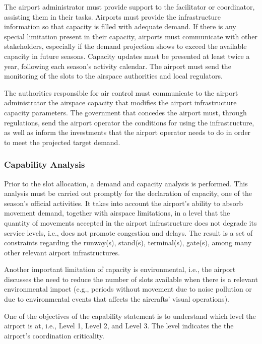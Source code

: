 The airport administrator must provide support to the facilitator or
coordinator, assisting them in their tasks.
%
Airports must provide the infrastructure information so that capacity is filled
with adequate demand.
%
If there is any special limitation present in their capacity, airports must
communicate with other stakeholders, especially if the demand projection
shows to exceed the available capacity in future seasons.
%
Capacity updates must be presented at least twice a year, following each
season's activity calendar.
%
The airport must send the monitoring of the slots to the airspace authorities
and local regulators.



The authorities responsible for air control must communicate to the airport
administrator the airspace capacity that modifies the airport infrastructure
capacity parameters.
%
The government that concedes the airport must, through regulations, send the
airport operator the conditions for using the infrastructure, as well as inform
the investments that the airport operator needs to do in order to meet the
projected target demand.




\subsubsection{Capability Analysis}

Prior to the slot allocation, a demand and capacity analysis is performed.
%
This analysis must be carried out promptly for the declaration of capacity, one
of the season's official activities.
%
It takes into account the airport's ability to absorb movement demand, together
with airspace limitations, in a level that the quantity of movements accepted in
the airport infrastructure does not degrade its service levels, i.e.,  does not
promote congestion and delays.
%
The result is a set of constraints regarding the runway(s), stand(s), terminal(s),
gate(s), among many other relevant airport infrastructures.



Another important limitation of capacity is environmental, i.e., the airport
discusses the need to reduce the number of slots available when there is a
relevant environmental impact (e.g., periods without movement due to noise
pollution or due to environmental events that affects the aircrafts’ visual
operations).
%



One of the objectives of the capability statement is to understand which level
the airport is at, i.e., Level 1, Level 2, and Level 3.
%
The level indicates the the airport's coordination criticality.
%



